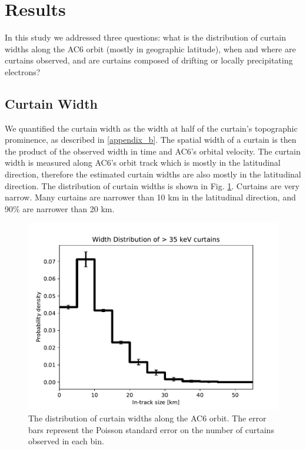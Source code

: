 \documentclass[draft]{agujournal2019}
\begin{document}
\section{Results} \label{results}
In this study we addressed three questions: what is the distribution of curtain widths along the AC6 orbit (mostly in geographic latitude), when and where are curtains observed, and are curtains composed of drifting or locally precipitating electrons?

\subsection{Curtain Width}
We quantified the curtain width as the width at half of the curtain's topographic prominence, as described in \ref{appendix_b}. The spatial width of a curtain is then the product of the observed width in time and AC6's orbital velocity. The curtain width is measured along AC6's orbit track which is mostly in the latitudinal direction, therefore the estimated curtain widths are also mostly in the latitudinal direction. The distribution of curtain widths is shown in Fig. \ref{width_dist}. Curtains are very narrow. Many curtains are narrower than 10 km in the latitudinal direction, and 90\% are narrower than 20 km.

\begin{figure}
\includegraphics[width=\textwidth]{fig2.pdf}
\caption{The distribution of curtain widths along the AC6 orbit. The error bars represent the Poisson standard error on the number of curtains observed in each bin.}
\label{width_dist}
\end{figure}
\end{document}
